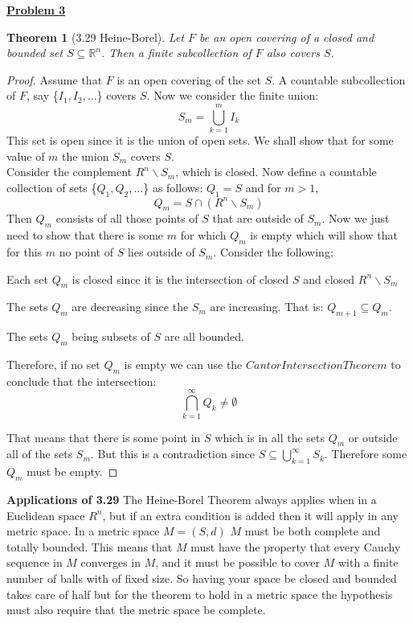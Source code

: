 \documentclass[aps,pra,notitlepage,amsmath,amssymb,letterpaper,12pt]{revtex4-1}
\newtheorem{theorem}{Theorem}
\begin{document}
\underline{\textbf{Problem 3}}
\begin{theorem}[3.29 Heine-Borel]
Let $F$ be an open covering of a closed and bounded set $S \subseteq \mathbb{R}^n$. Then a finite subcollection of $F$ also covers $S$.
\end{theorem}
\begin{proof}
Assume that \(F\) is an open covering of the set \(S\). A countable subcollection of \(F\), say \{\(I_1,I_2,\ldots\)\} covers \(S\).  Now we consider the finite union:
\[S_m = \bigcup\limits_{k=1}^{m} I_k\]
This set is open since it is the union of open sets.  We shall show that for some value of \(m\) the union \(S_m\) covers \(S\). \\
Consider the complement \(R^n \backslash S_m\), which is closed.  Now define a countable collection of sets \{\(Q_1,Q_2, \ldots\)\} as follows: \(Q_1 = S\) and for \(m>1\),
\[Q_m = S\cap (R^n\backslash S_m)\]
Then \(Q_m\) consists of all those points of \(S\) that are outside of \(S_m\).  Now we just need to show that there is some \(m\) for which \(Q_m\) is empty which will show that for this \(m\) no point of \(S\) lies outside of \(S_m\).
Consider the following: 

    Each set \(Q_m\) is closed since it is the intersection of closed \(S\) and closed \(R^n\backslash S_m\)
    
        The sets \(Q_m\) are decreasing since the \(S_m\) are increasing.  That is: \(Q_{m+1}\subseteq Q_m\). 
        
        The sets \(Q_m\) being subsets of \(S\) are all bounded.
        
        Therefore, if no set \(Q_m\) is empty we can use the \(Cantor Intersection Theorem\) to conclude that the intersection:
\[\bigcap\limits_{k=1}^{\infty} Q_k \neq \emptyset\]

    That means that there is some point in \(S\) which is in all the sets \(Q_m\) or outside all of the sets \(S_m\).  But this is a contradiction since \(S\subseteq \bigcup\limits_{k=1}^{\infty} S_k\).  Therefore some \(Q_m\) must be empty.
\end{proof}
\textbf{Applications of 3.29} \newline
The Heine-Borel Theorem always applies when in a Euclidean space $R^n$, but if an extra condition is added then it will apply in any metric space.  In a metric space \(M=(S,d)\) \(M\) must be both complete and totally bounded.  This means that \(M\) must have the property that every Cauchy sequence in \(M\) converges in \(M\), and it must be possible to cover \(M\) with a finite number of balls with of fixed size.  So having your space be closed and bounded takes care of half but for the theorem to hold in a metric space the hypothesis must also require that the metric space be complete.\newline{}
\end{document}
